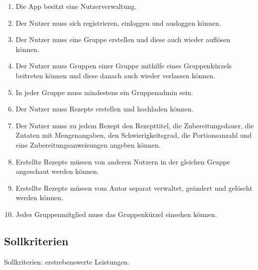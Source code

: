 \documentclass[parskip=full]{scrartcl}
\begin{document}
\begin{enumerate}[start=1,label={$\langle$\bfseries RM\arabic*$\rangle$}, leftmargin = 5em, itemsep=4pt, parsep=4pt]
    \item Die App besitzt eine Nutzerverwaltung.\label{RM1}
    \item Der Nutzer muss sich registrieren, einloggen und ausloggen können.\label{RM2}
    \item Der Nutzer muss eine Gruppe erstellen und diese auch wieder auflösen können.\label{RM3}
    \item Der Nutzer muss Gruppen einer Gruppe mithilfe eines Gruppenkürzels beitreten können und diese danach auch wieder verlassen können.\label{RM4}
    \item In jeder Gruppe muss mindestens ein Gruppenadmin sein.\label{RM5}
    \item Der Nutzer muss Rezepte erstellen und hochladen können.\label{RM6}
    \item Der Nutzer muss zu jedem Rezept den Rezepttitel, die Zubereitungsdauer, die Zutaten mit Mengenangaben, den Schwierigkeitsgrad, die Portionsanzahl und eine Zubereitungsanweisungen angeben können.\label{RM7}
    \item Erstellte Rezepte müssen von anderen Nutzern in der gleichen Gruppe angeschaut werden können.\label{RM8}
    \item Erstellte Rezepte müssen vom Autor separat verwaltet, geändert und gelöscht werden können.\label{RM9}
    \item Jedes Gruppenmitglied muss das Gruppenkürzel einsehen können.\label{RM10}
\end{enumerate}

\subsection{Sollkriterien}
Sollkriterien: erstrebenswerte Leistungen.
\end{document}
